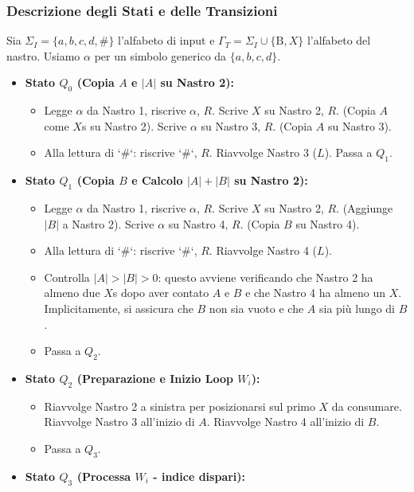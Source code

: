 \documentclass[a4paper]{article}
\newcommand{\B}{\text{B}} %
\begin{document}
\subsubsection{Descrizione degli Stati e delle Transizioni}
Sia $\Sigma_I = \{a,b,c,d,\#\}$ l'alfabeto di input e $\Gamma_T = \Sigma_I \cup \{\B, X\}$ l'alfabeto del nastro. Usiamo $\alpha$ per un simbolo generico da $\{a,b,c,d\}$.

\begin{itemize}
    \item \textbf{Stato $Q_0$ (Copia $A$ e $|A|$ su Nastro 2):}
        \begin{itemize}
            \item Legge $\alpha$ da Nastro 1, riscrive $\alpha$, $R$. Scrive $X$ su Nastro 2, $R$. (Copia $A$ come $X$s su Nastro 2). Scrive $\alpha$ su Nastro 3, $R$. (Copia $A$ su Nastro 3).
            \item Alla lettura di `#`: riscrive `#`, $R$. Riavvolge Nastro 3 ($L$). Passa a $Q_1$.
        \end{itemize}
    \item \textbf{Stato $Q_1$ (Copia $B$ e Calcolo $|A|+|B|$ su Nastro 2):}
        \begin{itemize}
            \item Legge $\alpha$ da Nastro 1, riscrive $\alpha$, $R$. Scrive $X$ su Nastro 2, $R$. (Aggiunge $|B|$ a Nastro 2). Scrive $\alpha$ su Nastro 4, $R$. (Copia $B$ su Nastro 4).
            \item Alla lettura di `#`: riscrive `#`, $R$. Riavvolge Nastro 4 ($L$).
            \item Controlla $|A|>|B|>0$: questo avviene verificando che Nastro 2 ha almeno due $X$s dopo aver contato $A$ e $B$ e che Nastro 4 ha almeno un $X$. Implicitamente, si assicura che $B$ non sia vuoto e che $A$ sia più lungo di $B$.
            \item Passa a $Q_2$.
        \end{itemize}
    \item \textbf{Stato $Q_2$ (Preparazione e Inizio Loop $W_i$):}
        \begin{itemize}
            \item Riavvolge Nastro 2 a sinistra per posizionarsi sul primo $X$ da consumare. Riavvolge Nastro 3 all'inizio di $A$. Riavvolge Nastro 4 all'inizio di $B$.
            \item Passa a $Q_3$.
        \end{itemize}
    \item \textbf{Stato $Q_3$ (Processa $W_i$ - indice dispari):}

\end{itemize}
\end{document}

